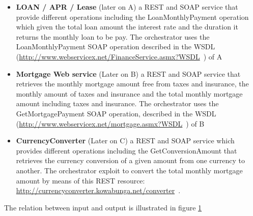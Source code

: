 \documentclass[
10pt, %
a4paper, %
oneside, %
headinclude,footinclude, %
BCOR5mm, %
]{scrartcl}
\def\restsource{\url{http://currencyconverter.kowabunga.net/converter}\ }
\def\mortgageservice{\url{http://www.webservicex.net/mortgage.asmx?WSDL}\ }
\def\financeservice{\url{http://www.webservicex.net/FinanceService.asmx?WSDL}\ }
\begin{document}
\begin{itemize}

\item \textbf{LOAN / APR / Lease} (later on A) a REST and SOAP service that provide
different operations including the LoanMonthlyPayment operation
which given the total loan amount the interest rate and the duration
it returns the monthly loan to be pay. The orchestrator uses
the LoanMonthlyPayment SOAP operation described in the WSDL
(\financeservice) of A
\item \textbf{Mortgage Web service} (Later on B) a REST and SOAP service that retrieves
the monthly mortgage amount free from taxes and insurance,
the monthly amount of taxes and insurance and the total monthly
mortgage amount including taxes and insurance. The orchestrator
uses the GetMortgagePayment SOAP operation, described in the WSDL
(\mortgageservice) of B
\item \textbf{CurrencyConverter} (Later on C) a REST and SOAP service which provides
different operations including the GetConversionAmount that
retrieves the currency conversion of a given amount from one currency
to another. The orchestrator exploit to convert the total monthly mortgage
amount by means of this REST resource: \restsource.

\end{itemize}


The relation between input and output is illustrated in figure \ref{fig:IORelations}

\begin{figure}[tb]
\centering
{} \quad
{} \\
\caption[IO Relations]{} %
\label{fig:IORelations}
\end{figure}
\end{document}
